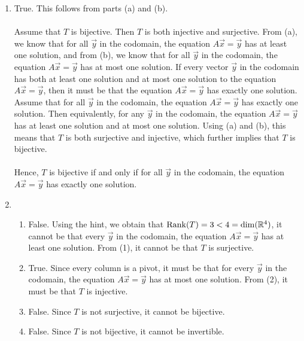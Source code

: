 \begin{SaveQuestion}
\begin{enumerate}
        \item True. This follows from parts (a) and (b). \\ \\
        Assume that $T$ is bijective. Then $T$ is both injective and surjective. From (a), we know that for all $\vec y$ in the codomain, the equation $A \vec x = \vec y$ has at least one solution, and from (b), we know that for all $\vec y$ in the codomain, the equation $A\vec x = \vec y$ has at most one solution. If every vector $\vec y$ in the codomain has both at least one solution and at most one solution to the equation $A\vec x = \vec y$, then it must be that the equation $A\vec x = \vec y$ has exactly one solution.
        Assume that for all $\vec y$ in the codomain, the equation $A\vec x = \vec y$ has exactly one solution. Then equivalently, for any $\vec y$ in the codomain, the equation $A\vec x = \vec y$ has at least one solution and at most one solution. Using (a) and (b), this means that $T$ is both surjective and injective, which further implies that $T$ is bijective. \\ \\
        Hence, $T$ is bijective if and only if for all $\vec y$ in the codomain, the equation $A\vec x = \vec y$ has exactly one solution.

        \item \begin{enumerate}
            \item False. Using the hint, we obtain that $\operatorname{Rank}(T) = 3 < 4 = \dim(\mathbb{R}^4)$, it cannot be that every $\vec y$ in the codomain, the equation $A \vec x = \vec y$ has at least one solution. From (1), it cannot be that $T$ is surjective.  
            \item True. Since every column is a pivot, it must be that for every $\vec y$ in the codomain, the equation $A \vec x = \vec y$ has at most one solution. From (2), it must be that $T$ is injective. 
            \item False. Since $T$ is not surjective, it cannot be bijective.
            \item False. Since $T$ is not bijective, it cannot be invertible.
        \end{enumerate}
	\end{enumerate}
\end{SaveQuestion}


